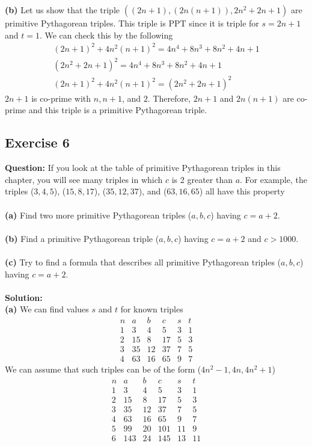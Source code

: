 \documentclass{article}
\begin{document}
\textbf{(b)} Let us show that the triple $((2n+1),(2n(n+1)), 2n^{2}+2n+1)$ are primitive Pythagorean triples. This triple is PPT since it is triple for $s = 2n+1$ and $t=1$. We can check this by the following
\begin{equation*}
\begin{split}
(2n+1)^2+4n^2(n+1)^2 = 4n^4+8n^3+8n^2+4n+1
\\(2n^2+2n+1)^2=4n^4+8n^3+8n^2+4n+1
\\(2n+1)^2+4n^2(n+1)^2=(2n^2+2n+1)^2
\end{split}
\end{equation*}
$2n+1$ is co-prime with $n,n+1$, and $2$. Therefore, $2n+1$ and $2n(n+1)$ are co-prime and this triple is a primitive Pythagorean triple.
\newpage
\subsection{Exercise 6}
\textbf{Question:} If you look at the table of primitive Pythagorean triples in this chapter, you will see many triples in which $c$ is 2 greater than $a$. For example, the triples ($3, 4, 5$), ($15, 8, 17$), ($35, 12, 37$), and ($63, 16, 65$) all have this property\\
\\\textbf{(a)} Find two more primitive Pythagorean triples ($a,b,c$) having $c = a+2$.\\
\\\textbf{(b)} Find a primitive Pythagorean triple ($a,b,c$) having $c = a+2$ and $c > 1000$.\\
\\\textbf{(c)} Try to find a formula that describes all primitive Pythagorean triples ($a,b,c$) having $c = a+2$.\\
\\\textbf{Solution:}\\
\textbf{(a)} We can find values $s$ and $t$ for known triples
\begin{displaymath}
\begin{array}{c|c|c|c|c|c}
n & a & b & c & s & t\\
\hline
1 & 3 & 4 & 5 & 3 & 1\\
2 & 15 & 8 & 17 & 5 & 3\\
3 & 35 & 12 & 37 & 7 & 5\\
4 & 63 & 16 & 65 & 9 & 7
\end{array}
\end{displaymath}
We can assume that such triples can be of the form ($4n^2-1,4n,4n^2+1$)
\begin{displaymath}
\begin{array}{c|c|c|c|c|c}
n & a & b & c & s & t\\
\hline
1 & 3 & 4 & 5 & 3 & 1\\
2 & 15 & 8 & 17 & 5 & 3\\
3 & 35 & 12 & 37 & 7 & 5\\
4 & 63 & 16 & 65 & 9 & 7\\
5 & 99 & 20 & 101 & 11 & 9\\
6 & 143 & 24 & 145 & 13 & 11
\end{array}
\end{displaymath}
\end{document}
